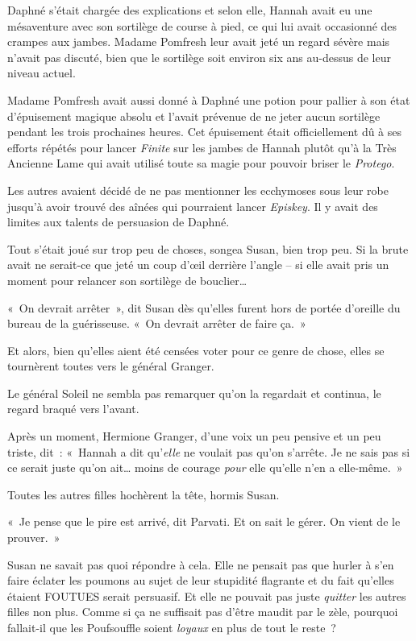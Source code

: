Daphné s'était chargée des explications et selon elle, Hannah avait eu une mésaventure avec son sortilège de course à pied, ce qui lui avait occasionné des crampes aux jambes.
Madame Pomfresh leur avait jeté un regard sévère mais n'avait pas discuté, bien que le sortilège soit environ six ans au-dessus de leur niveau actuel.

Madame Pomfresh avait aussi donné à Daphné une potion pour pallier à son état d'épuisement magique absolu et l'avait prévenue de ne jeter aucun sortilège pendant les trois prochaines heures.
Cet épuisement était officiellement dû à ses efforts répétés pour lancer \emph{Finite} sur les jambes de Hannah plutôt qu'à la Très Ancienne Lame qui avait utilisé toute sa magie pour pouvoir briser le \emph{Protego}.

Les autres avaient décidé de ne pas mentionner les ecchymoses sous leur robe jusqu'à avoir trouvé des aînées qui pourraient lancer \emph{Episkey}.
Il y avait des limites aux talents de persuasion de Daphné.

Tout s'était joué sur trop peu de choses, songea Susan, bien trop peu.
Si la brute avait ne serait-ce que jeté un coup d'œil derrière l'angle -- si elle avait pris un moment pour relancer son sortilège de bouclier…

«~On devrait arrêter~», dit Susan dès qu'elles furent hors de portée d'oreille du bureau de la guérisseuse.
«~On devrait arrêter de faire ça.~»

Et alors, bien qu'elles aient été censées voter pour ce genre de chose, elles se tournèrent toutes vers le général Granger.

Le général Soleil ne sembla pas remarquer qu'on la regardait et continua, le regard braqué vers l'avant.

Après un moment, Hermione Granger, d'une voix un peu pensive et un peu triste, dit~: «~Hannah a dit qu'\emph{elle} ne voulait pas qu'on s'arrête.
Je ne sais pas si ce serait juste qu'on ait… moins de courage \emph{pour} elle qu'elle n'en a elle-même.~»

Toutes les autres filles hochèrent la tête, hormis Susan.

«~Je pense que le pire est arrivé, dit Parvati.
Et on sait le gérer.
On vient de le prouver.~»

Susan ne savait pas quoi répondre à cela.
Elle ne pensait pas que hurler à s'en faire éclater les poumons au sujet de leur stupidité flagrante et du fait qu'elles étaient FOUTUES serait persuasif.
Et elle ne pouvait pas juste \emph{quitter} les autres filles non plus.
Comme si ça ne suffisait pas d'être maudit par le zèle, pourquoi fallait-il que les Poufsouffle soient \emph{loyaux} en plus de tout le reste~?

